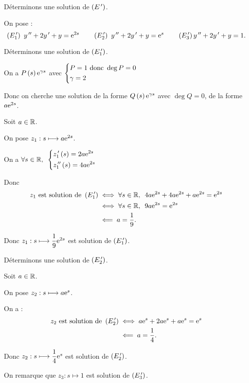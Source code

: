 \begin{corr}
Déterminons une solution de \(\left(E^{\,\prime}\right)\).

On pose : \[\left(E_1^{\,\prime}\right)~y^{\,\prime\prime}+2y^{\,\prime}+y=\mathrm{e}^{2s}\qquad\left(E_2^{\,\prime}\right)~y^{\,\prime\prime}+2y^{\,\prime}+y=\mathrm{e}^{s}\qquad\left(E_3^{\,\prime}\right)y^{\,\prime\prime}+2y^{\,\prime}+y=1.\]

Déterminons une solution de \(\left(E_1^{\,\prime}\right)\).

\begin{brouill}
On a \(P\left(s\right)\mathrm{e}^{\gamma s}\) avec \(\begin{dcases}
P=1\text{ donc }\deg P=0 \\
\gamma=2
\end{dcases}\)

Donc on cherche une solution de la forme \(Q\left(s\right)\mathrm{e}^{\gamma s}\) avec \(\deg Q=0\), \cad de la forme \(a\mathrm{e}^{2s}\).
\end{brouill}

Soit \(a\in\mathbb{R}\).

On pose \(z_1:s\longmapsto a\mathrm{e}^{2s}\).

On a \(\quantifs{\forall s\in\R}\begin{dcases}
z_1\prim\paren{s}=2a\e{2s} \\
z_1\seconde\paren{s}=4a\e{2s}
\end{dcases}\)

Donc \[\begin{aligned}
z_1\text{ est solution de }\paren{E_1\prim}&\ssi\quantifs{\forall s\in\R}4a\e{2s}+4a\e{2s}+a\e{2s}=\e{2s} \\
&\ssi\quantifs{\forall s\in\R}9a\e{2s}=\e{2s} \\
&\impr a=\dfrac{1}{9}.
\end{aligned}\]

Donc \(z_1:s\longmapsto\dfrac{1}{9}\mathrm{e}^{2s}\) est solution de \(\left(E_1^{\,\prime}\right)\).

Déterminons une solution de \(\left(E_2^{\,\prime}\right)\).

Soit \(a\in\mathbb{R}\).

On pose \(z_2:s\longmapsto a\mathrm{e}^{s}\).

On a : \[\begin{aligned}
z_2\text{ est solution de }\left(E_2^{\,\prime}\right)&\iff a\mathrm{e}^{s}+2a\mathrm{e}^{s}+a\mathrm{e}^{s}=\mathrm{e}^{s} \\
&\impliedby a=\dfrac{1}{4}.
\end{aligned}\]

Donc \(z_2:s\longmapsto\dfrac{1}{4}\mathrm{e}^{s}\) est solution de \(\left(E_2^{\,\prime}\right)\).

On remarque que \(z_3:s\mapsto1\) est solution de \(\left(E_3^{\,\prime}\right)\).


\end{corr}
